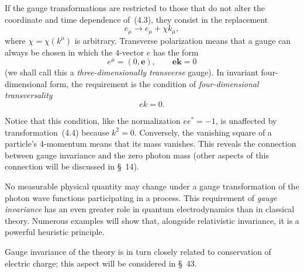 If the gauge transformations are restricted to those that do not alter the coordinate and time dependence of~(4.3), they consist in the replacement
\begin{equation}
e_\mu \to e_\mu + \chi k_\mu,
\tag{4.4}
\end{equation}
where $\chi = \chi(k^\mu)$ is arbitrary. Transverse polarization means that a gauge can always be chosen in which the 4-vector $e$ has the form
\begin{equation}
e^\mu = (0,\mathbf{e}),\qquad \mathbf{ek} = 0
\tag{4.5}
\end{equation}
(we shall call this a \emph{three-dimensionally transverse} gauge). In invariant four-dimensional form, the requirement is the condition of \emph{four-dimensional transversality}
\begin{equation}
ek = 0.
\tag{4.6}
\end{equation}

Notice that this condition, like the normalization $ee^* = -1$, is unaffected by transformation~(4.4) because $k^2 = 0$. Conversely, the vanishing square of a particle's 4-momentum means that its mass vanishes. This reveals the connection between gauge invariance and the zero photon mass (other aspects of this connection will be discussed in \S~14).

No measurable physical quantity may change under a gauge transformation of the photon wave functions participating in a process. This requirement of \emph{gauge invariance} has an even greater role in quantum electrodynamics than in classical theory. Numerous examples will show that, alongside relativistic invariance, it is a powerful heuristic principle.

Gauge invariance of the theory is in turn closely related to conservation of electric charge; this aspect will be considered in \S~43.

